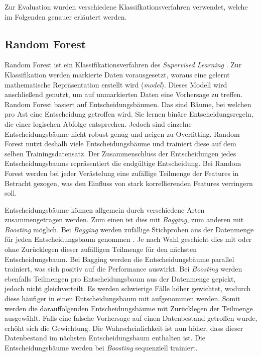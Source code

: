 Zur Evaluation wurden verschiedene Klassifkationsverfahren verwendet, welche im Folgenden genauer erläutert werden.

\subsection{Random Forest}
\label{ch:Basics:se:ml:ss:randomForest}

Random Forest ist ein Klassifikationsverfahren des \textit{Supervised Learning} \cite{WaybackMachine2016}. 
Zur Klassifikation werden markierte Daten vorausgesetzt, woraus eine gelernt mathematische Repräsentation erstellt wird (\textit{model}). 
Dieses Modell wird anschließend genutzt, um auf unmarkierten Daten eine Vorhersage zu treffen.
Random Forest basiert auf Entscheidungsbäumen. 
Das sind Bäume, bei welchen pro Ast eine Entscheidung getroffen wird.
Sie lernen binäre Entscheidungsregeln, die einer logischen Abfolge entsprechen.
Jedoch sind einzelne Entscheidungsbäume nicht robust genug und neigen zu Overfitting.
Random Forest nutzt deshalb viele Entscheidungsbäume und trainiert diese auf dem selben Trainingsdatensatz. 
Der Zusammenschluss der Entscheidungen jedes Entscheidungsbaums repräsentiert die endgültige Entscheidung.
Bei Random Forest werden bei jeder Verästelung eine zufällige Teilmenge der Features in Betracht gezogen, was den Einfluss von stark korrellierenden Features verringern soll.

Entscheidungsbäume können allgemein durch verschiedene Arten zusammengetragen werden. 
Zum einen ist dies mit \textit{Bagging}, zum anderen mit \textit{Boosting} möglich.
Bei \textit{Bagging} werden zufällige Stichproben aus der Datenmenge für jeden Entscheidungsbaum genommen \cite{jamesIntroductionStatisticalLearning2013}.
Je nach Wahl geschieht dies mit oder ohne Zurücklegen dieser zufälligen Teilmenge für den nächsten Entscheidungsbaum.
Bei Bagging werden die Entscheidungsbäume parallel trainiert, was sich positiv auf die Performance auswirkt.
Bei \textit{Boosting} werden ebenfalls Teilmengen pro Entscheidungsbaum aus der Datenmenge gepickt, jedoch nicht gleichverteilt. 
Es werden schwierige Fälle höher gewichtet, wodurch diese häufiger in einen Entscheidungsbaum mit aufgenommen werden. 
Somit werden die darauffolgenden Entscheidungsbäume mit Zurücklegen der Teilmenge ausgewählt.
Falls eine falsche Vorhersage auf einen Datenbestand getroffen wurde, erhöht sich die Gewichtung.
Die Wahrscheinlichkeit ist nun höher, dass dieser Datenbestand im nächsten Entscheidungsbaum enthalten ist.
Die Entscheidungsbäume werden bei \textit{Boosting} sequenziell trainiert.

